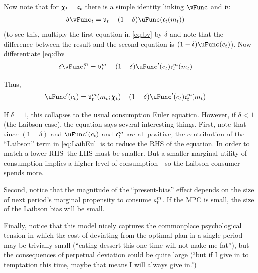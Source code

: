 \documentclass{handout}
\begin{document}
Now note that for $\pmb{\chi}_{t}=\mathfrak{c}_{t}$ there is a simple identity linking $\bv$ and $\mathfrak{v}$:
\begin{equation}\begin{gathered}\begin{aligned}
  \delta \bv_{t} & =  \gv_{t} - (1-\delta) \bu(\gc_{t}(m_{t})) \label{eq:dbv}
\end{aligned}\end{gathered}\end{equation}
(to see this, multiply the first equation in \eqref{eq:bv} by $\delta$ and note that the difference between
the result and the second equation is $(1-\delta) \bu(c_{t})$).  Now differentiate \eqref{eq:dbv}
\begin{equation}\begin{gathered}\begin{aligned}
  \delta \bv_{t}^{m} & =  \gv_{t}^{m} - (1-\delta) \bu^{\prime}(c_{t})\gc_{t}^{m}(m_{t})
\end{aligned}\end{gathered}\end{equation}

Thus, 
\begin{equation}\begin{gathered}\begin{aligned}
  \uFunc^{\prime}(c_{t}) & =  \gv_{t}^{m}(m_{t};\pmb{\chi}_{t}) - (1-\delta) \bu^{\prime}(c_{t})\gc_{t}^{m}(m_{t}) \label{eq:LaibEul}
\end{aligned}\end{gathered}\end{equation}


If $\delta=1$, this collapses to the usual consumption Euler equation.  
However, if $\delta < 1$ (the Laibson case), the equation says 
several interesting things.  First, note that since $(1-\delta)$ 
and $\bu^{\prime}(c_{t})$ and $\mathfrak{c}^{m}_{t}$ are all positive, 
the contribution of the ``Laibson'' term in \eqref{eq:LaibEul} is
to reduce the RHS of the equation.  In order to match a lower RHS,
the LHS must be smaller.  But a smaller marginal utility of consumption
implies a higher level of consumption - so the Laibson consumer spends
more.

Second, notice that the magnitude of the ``present-bias'' effect depends
on the size of next period's marginal propensity to consume $\mathfrak{c}_{t}^{m}$.
If the MPC is small, the size of the Laibson bias will be small.

Finally, notice that this model nicely captures the commonplace psychological 
tension in which the cost of deviating from the optimal plan in a single period
may be trivially small (``eating dessert this one time will not make me fat''),
but the consequences of perpetual deviation could be quite large (``but if I give 
in to temptation this time, maybe that means I will always give in.'')  

 

\end{document}
